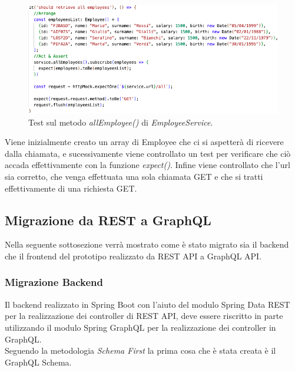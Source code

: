 \begin{figure}[!ht]
\centering
\includegraphics[width=0.8\linewidth]{immagini/allEmployeeTest.png}
\caption{Test sul metodo \textit{allEmployee()} di \textit{EmployeeService}.}
\label{get-all-test}
\end{figure}
\FloatBarrier
Viene inizialmente creato un array di Employee che ci si aspetterà di ricevere dalla chiamata, e sucessivamente viene controllato un test per verificare che ciò accada effettivamente con la funzione \textit{expect()}. Infine viene controllato che l'url sia corretto, che venga effettuata una sola chiamata GET e che si tratti effettivamente di una richiesta GET.

\subsection{Migrazione da REST a GraphQL}
Nella seguente sottosezione verrà mostrato come è stato migrato sia il backend che il frontend del prototipo realizzato da REST API a GraphQL API.
\subsubsection*{Migrazione Backend}
Il backend realizzato in Spring Boot con l'aiuto del modulo Spring Data REST per la realizzazione dei controller di REST API, deve essere riscritto in parte utilizzando il modulo Spring GraphQL per la realizzazione dei controller in GraphQL.\\
Seguendo la metodologia \textit{Schema First} la prima cosa che è stata creata è il GraphQL Schema.

